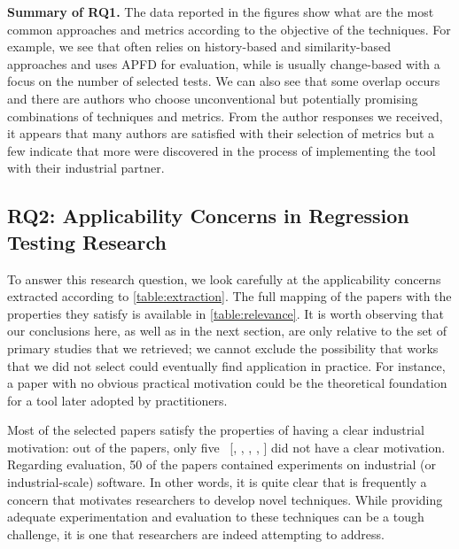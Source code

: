 \begin{tcolorbox}%
\textbf{Summary of RQ1.} The data reported in the figures show what are the most common approaches and metrics according to the objective of the \rt techniques. For example, we see that \tcp often relies on history-based and similarity-based approaches and uses APFD for evaluation, while \tcs is usually change-based with a focus on the number of selected tests.
We can also see that some overlap occurs and there are authors who choose unconventional but potentially promising combinations of techniques and metrics.
From the author responses we received, it appears that many authors are satisfied with their selection of metrics but a few indicate that more were discovered in the process of implementing the tool with their industrial partner.
\end{tcolorbox}


\subsection{RQ2: Applicability Concerns in Regression Testing Research}
\label{sec:lit_rq2}

%

To answer this research question, we look carefully at the applicability concerns extracted according to \autoref{table:extraction}.
The full mapping of the papers with the properties they satisfy is available in \autoref{table:relevance}.
It is worth observing that our conclusions here, as well as in the next section, are only relative to the set of primary studies that we retrieved; we cannot exclude the possibility that works that we did not select could eventually find application in practice.
For instance, a paper with no obvious practical motivation could be the theoretical foundation for a tool later adopted by practitioners.

Most of the selected papers satisfy the properties of having a clear industrial motivation: out of the \numpapers papers, only five~
[, 
,
,  
, 
] did not have a clear \rea motivation.
Regarding evaluation, 50 of the papers contained experiments on industrial (or industrial-scale) software.
In other words, it is quite clear that \rea is frequently a concern that motivates researchers to develop novel \rt techniques.
While providing adequate experimentation and evaluation to these techniques can be a tough challenge, it is one that researchers are indeed attempting to address.

